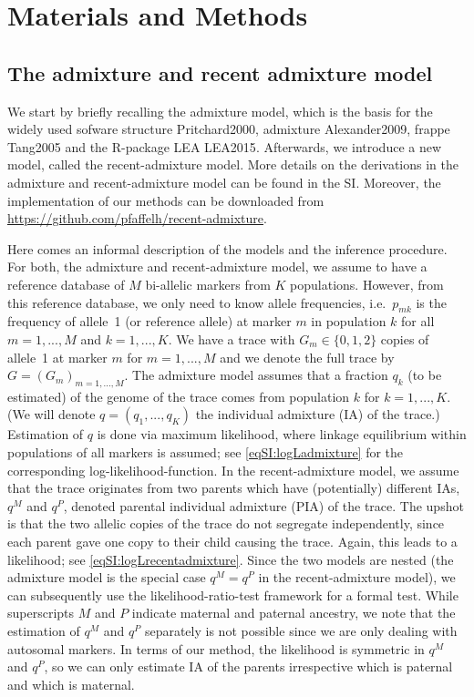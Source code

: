 \documentclass[12pt]{article}
\theoremstyle{definition}
\begin{document}
\section{Materials and Methods}
\subsection{The admixture and recent admixture model}
We start by briefly recalling the admixture model, which is the basis for the widely used sofware {\sc structure} \cite{article}{Pritchard2000}, {\sc admixture} \cite{article}{Alexander2009}, {\sc frappe} \cite{article}{Tang2005} {\color{blue}and the {\sc R}-package {\sc LEA} \cite{article}{LEA2015}}. Afterwards, we introduce a new model, called the recent-admixture model. More details on the derivations in the admixture and recent-admixture model can be found in the SI. Moreover, the implementation of our methods can be downloaded from \url{https://github.com/pfaffelh/recent-admixture}. 

{\color{blue} Here comes an informal description of the models and the inference procedure.} For both, the admixture and recent-admixture model, we assume to have a reference database of $M$ bi-allelic markers from $K$ populations. However, from this reference database, we only need to know allele frequencies, i.e.\  $p_{mk}$ is the frequency of allele~1 (or reference allele) at marker $m$ in population $k$ for all $m=1,...,M$ and $k=1,...,K$. We have a trace with $G_m \in \{0,1,2\}$ copies of allele~1 at marker $m$ for $m=1,...,M${\color{blue} and we denote the full trace by $G = (G_m)_{m=1,...,M}$}. {\color{blue} The admixture model assumes that a fraction $q_k$ (to be estimated) of the genome of the trace comes from population $k$ for $k=1,...,K$. (We will denote $q = (q_1,...,q_K)$ the individual admixture (IA) of the trace.) Estimation of $q$ is done via maximum likelihood, where linkage equilibrium within populations of all markers is assumed; see \eqref{eqSI:logLadmixture} for the corresponding log-likelihood-function. In the recent-admixture model, we assume that the trace originates from two parents which have (potentially) different IAs, $q^M$ and $q^P$, denoted parental individual admixture (PIA) of the trace. The upshot is that the two allelic copies of the trace do not segregate independently, since each parent gave one copy {\color{blue} to their child causing} the trace. Again, this leads to a likelihood; see \eqref{eqSI:logLrecentadmixture}. Since the two models are nested (the admixture model is the special case $q^M = q^P$ in the recent-admixture model), we can subsequently use the likelihood-ratio-test framework for a formal test.} {\color{blue} While superscripts $M$ and $P$ indicate maternal and paternal ancestry, we note that the estimation of $q^M$ and $q^P$ separately is not possible since we are only dealing with autosomal markers. In terms of our method, the likelihood is symmetric in $q^M$ and $q^P$, so we can only estimate IA of the parents irrespective which is paternal and which is maternal. }
\end{document}
